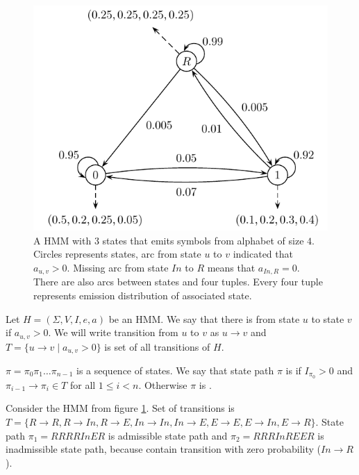 \begin{figure}
\begin{center}
\includegraphics{../figures/exampleHMM.pdf}
\end{center}
\caption[Example of simple Hidden Markov Model]{
A HMM with $3$ states
that emits symbols from alphabet of size $4$.  Circles represents states, arc
from state $u$ to $v$ indicated that $a_{u,v}>0$. Missing arc from state
$In$ to $R$ means that $a_{In,R}=0$.  There are also arcs between states and
four tuples. Every four tuple represents emission distribution of associated state.
}\label{FIGURE:EXAMPLEHMM} 
\end{figure}


\begin{definition}\label{DEF:STATEPATH}
Let $H=(\Sigma,V,I,e,a)$ be an HMM. We say that there is 
from state $u$ to state $v$ if $a_{u,v}>0$. We will write transition from $u$ to
$v$ as $u\to v$ and $T=\{u\to v\mid a_{u,v}>0\}$ is set of all transitions of
$H$.

 $\pi=\pi_0\pi_1\dots\pi_{n-1}$ is a sequence of
states. We say that state path $\pi$ is  if $I_{\pi_0}>0$
and  $\pi_{i-1}\to\pi_i\in T$ for all $1\leq i < n$. Otherwise $\pi$ is
.
\end{definition}

\begin{example}
Consider the HMM from figure \ref{FIGURE:EXAMPLEHMM}. Set of transitions is
$T=\{R\to R,R\to In, R\to E,In\to In, In\to E, E\to E, E\to In, E\to R\}$.
State path $\pi_1=RRRRInER$ is admissible state path and $\pi_2=RRRInREER$ is inadmissible
state path, because contain transition with zero probability ($In\to R$).
\end{example}



